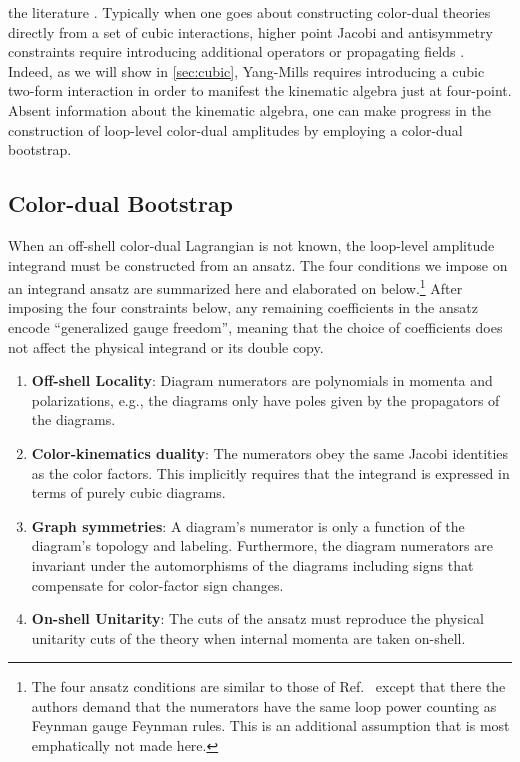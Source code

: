 \documentclass[11pt,letter]{article}
\begin{document}
the literature \cite{Monteiro2011pc, Cheung:2016prv, Cheung:2021zvb,
  Cheung:2020djz, Ben-Shahar:2022ixa, Ben-Shahar:2021zww,
  Ben-Shahar:2021doh}.
Typically when one goes about constructing color-dual
theories directly from a set of cubic interactions, higher point
Jacobi and antisymmetry constraints require introducing additional operators \cite{Carrasco:2022lbm,Carrasco:2022sck} or propagating fields \cite{Ben-Shahar:2022ixa}.
Indeed, as we will show in \cref{sec:cubic}, Yang-Mills
requires introducing a cubic two-form interaction in order to manifest
the kinematic algebra just at four-point. Absent information about the
kinematic algebra, one can make progress in the construction of
loop-level color-dual amplitudes by employing a color-dual bootstrap.


\subsection{Color-dual Bootstrap}
\label{sec:bootstrap}

When an off-shell color-dual Lagrangian is not known, the loop-level
amplitude integrand must be constructed from an ansatz.  The four
conditions we impose on an integrand ansatz are summarized here and
elaborated on below.\footnote{The four ansatz conditions are similar
  to those of Ref.~\cite{Bern:2015ooa} except that there the authors
  demand that the numerators have the same loop power counting as
  Feynman gauge Feynman rules.  This is an additional assumption that
  is most emphatically not made here.}
After imposing the four constraints below, any remaining coefficients in the ansatz encode ``generalized gauge freedom'', meaning that the
choice of coefficients does not affect the physical integrand or its double copy.
\begin{enumerate}
\item \textbf{Off-shell Locality}: Diagram numerators are polynomials
  in momenta and polarizations, e.g., the diagrams only have poles given
  by the propagators of the diagrams.
\item \textbf{Color-kinematics duality}: The numerators obey the same
  Jacobi identities as the color factors.  This implicitly requires
  that the integrand is expressed in terms of purely cubic diagrams.
\item \textbf{Graph symmetries}: A diagram's numerator is only a
  function of the diagram's topology and labeling.  Furthermore, the
  diagram numerators are invariant under the automorphisms of the
  diagrams including signs that compensate for color-factor sign
    changes.
\item \textbf{On-shell Unitarity}: The cuts of the ansatz must
  reproduce the physical unitarity cuts of the theory when internal
  momenta are taken on-shell.
\end{enumerate}
\end{document}

